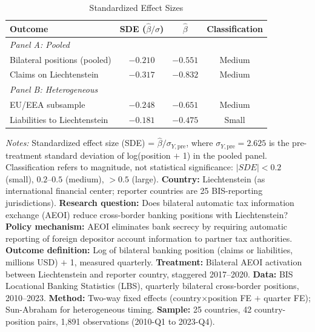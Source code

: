 \begin{table}[t]
\centering
\caption{Standardized Effect Sizes}
\label{tab:sde}
\begin{tabular}{lccc}
\hline\hline
Outcome & SDE ($\hat{\beta}/\sigma$) & $\hat{\beta}$ & Classification \\
\hline
\multicolumn{4}{l}{\textit{Panel A: Pooled}} \\
Bilateral positions (pooled) & $-0.210$ & $-0.551$ & Medium \\
Claims on Liechtenstein & $-0.317$ & $-0.832$ & Medium \\
\hline
\multicolumn{4}{l}{\textit{Panel B: Heterogeneous}} \\
EU/EEA subsample & $-0.248$ & $-0.651$ & Medium \\
Liabilities to Liechtenstein & $-0.181$ & $-0.475$ & Small \\
\hline\hline
\end{tabular}
\begin{tablenotes}
\item \textit{Notes:} Standardized effect size (SDE) = $\hat{\beta} / \sigma_{Y,\text{pre}}$, where $\sigma_{Y,\text{pre}} = 2.625$ is the pre-treatment standard deviation of log(position $+$ 1) in the pooled panel. Classification refers to magnitude, not statistical significance: $|SDE| < 0.2$ (small), $0.2$--$0.5$ (medium), $> 0.5$ (large).
\textbf{Country:} Liechtenstein (as international financial center; reporter countries are 25 BIS-reporting jurisdictions).
\textbf{Research question:} Does bilateral automatic tax information exchange (AEOI) reduce cross-border banking positions with Liechtenstein?
\textbf{Policy mechanism:} AEOI eliminates bank secrecy by requiring automatic reporting of foreign depositor account information to partner tax authorities.
\textbf{Outcome definition:} Log of bilateral banking position (claims or liabilities, millions USD) $+$ 1, measured quarterly.
\textbf{Treatment:} Bilateral AEOI activation between Liechtenstein and reporter country, staggered 2017--2020.
\textbf{Data:} BIS Locational Banking Statistics (LBS), quarterly bilateral cross-border positions, 2010--2023.
\textbf{Method:} Two-way fixed effects (country$\times$position FE $+$ quarter FE); Sun-Abraham for heterogeneous timing.
\textbf{Sample:} 25 countries, 42 country-position pairs, 1,891 observations (2010-Q1 to 2023-Q4).
\end{tablenotes}
\end{table}
